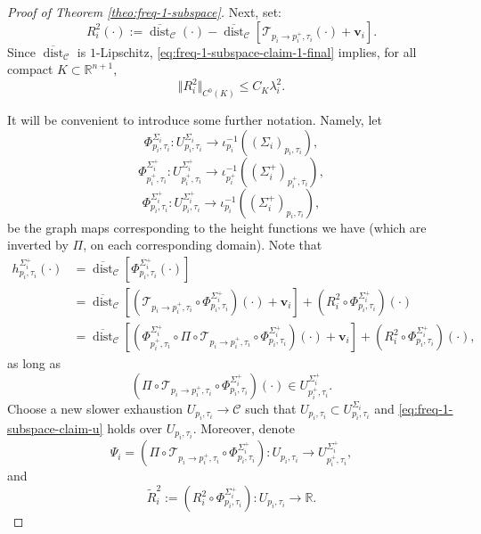 \documentclass[11pt, letterpaper, reqno]{amsart}
\numberwithin{equation}{section}
\theoremstyle{remark}
\newcommand{\RR}{\mathbb{R}}
\newcommand{\cC}{\mathcal{C}}
\newcommand{\cT}{\mathcal{T}}
\newcommand{\mbfv}{\mathbf{v}}
\newcommand{\dist}{\operatorname{dist}}
\newcommand{\Sdist}{\overline{\dist}}
\begin{document}
\begin{proof}[Proof of Theorem \ref{theo:freq-1-subspace}]
Next, set:
\[
	R^2_i(\cdot) := \Sdist_{\cC}(\cdot) - \Sdist_{\cC} \left[ \cT_{p_i \to p_i^+, \tau_i}(\cdot) + \mbfv_i \right].
\]
Since $\Sdist_\cC$ is $1$-Lipschitz, \eqref{eq:freq-1-subspace-claim-1-final} implies, for all compact $K \subset \RR^{n+1}$,
\begin{equation} \label{eq:freq-1-subspace-claim-2}
	\Vert R^2_i \Vert_{C^0(K)} \leq C_K \lambda_i^2.
\end{equation}

It will be convenient to introduce some further notation. Namely, let
\[ \Phi^{\Sigma_i}_{p_i, \tau_i} : U^{\Sigma_i}_{p_i, \tau_i} \to \iota_{p_i}^{-1}((\Sigma_i)_{p_i,\tau_i}), \]
\[ \Phi^{\Sigma_i^+}_{p_i^+, \tau_i} : U^{\Sigma_i^+}_{p_i^+, \tau_i} \to \iota_{p_i^+}^{-1}((\Sigma^+_i)_{p_i^+,\tau_i}), \]
\[ \Phi^{\Sigma_i^+}_{p_i, \tau_i} : U^{\Sigma_i^+}_{p_i, \tau_i} \to \iota_{p_i}^{-1}((\Sigma^+_i)_{p_i,\tau_i}), \]
be the graph maps corresponding to the height functions we have (which are inverted by $\Pi$, on each corresponding domain). Note that
\begin{align}
	h^{\Sigma_i^+}_{p_i,\tau_i}(\cdot)
		& = \Sdist_{\cC} \left[ \Phi^{\Sigma_i^+}_{p_i, \tau_i}(\cdot) \right] \nonumber \\
		& = \Sdist_{\cC} \left[ \left(\cT_{p_i \to p_i^+, \tau_i} \circ \Phi^{\Sigma_i^+}_{p_i, \tau_i}\right)(\cdot) + \mbfv_i \right] + \left( R^2_i \circ \Phi^{\Sigma_i^+}_{p_i, \tau_i}\right)(\cdot) \nonumber \\
		& = \Sdist_{\cC} \left[ \left(\Phi^{\Sigma_i^+}_{p_i^+, \tau_i} \circ \Pi \circ \cT_{p_i\to p_i^+, \tau_i} \circ \Phi^{\Sigma_i^+}_{p_i, \tau_i} \right)(\cdot) + \mbfv_i \right] + \left( R^2_i \circ \Phi^{\Sigma_i^+}_{p_i, \tau_i} \right)(\cdot), \label{eq:freq-1-subspace-h-redefn-1}
\end{align}
as long as
\begin{equation} \label{eq:freq-1-subspace-claim-u}
	\left( \Pi \circ \cT_{p_i \to p_i^+, \tau_i} \circ \Phi^{\Sigma_i^+}_{p_i, \tau_i}\right)(\cdot) \in U^{\Sigma_i^+}_{p_i^+, \tau_i}.
\end{equation}
Choose a new slower exhaustion $U_{p_i, \tau_i} \to \cC$ such that $U_{p_i, \tau_i} \subset U^{\Sigma_i}_{p_i, \tau_i}$ and \eqref{eq:freq-1-subspace-claim-u} holds over $U_{p_i, \tau_i}$. Moreover, denote
\[ \Psi_i = \left( \Pi \circ \cT_{p_i \to p_i^+, \tau_i} \circ \Phi^{\Sigma_i^+}_{p_i, \tau_i}\right) : U_{p_i, \tau_i} \to U^{\Sigma_i^+}_{p_i^+, \tau_i}, \]
and
\[ \tilde R^2_i := \left( R^2_i \circ \Phi^{\Sigma_i^+}_{p_i, \tau_i} \right) : U_{p_i, \tau_i} \to \RR. \]

\end{proof}
\end{document}
